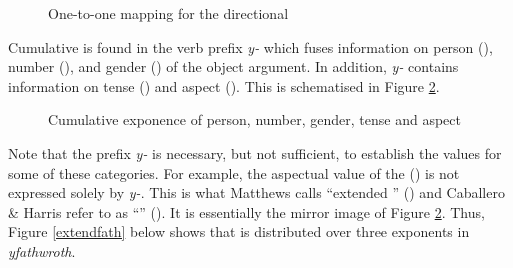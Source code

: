 \begin{figure}
\begin{center}
\end{center}
\caption{One-to-one mapping for the directional}
\label{one-to-one}
\end{figure}%

Cumulative  is found in the verb prefix \emph{y-} which fuses information on person (\Third), number (\Sg), and gender (\Masc) of the object argument. In addition, \emph{y-} contains information on tense (\Nonpast) and aspect (\Ipfv{}). This is schematised in Figure \ref{cumulfath}.

\begin{figure}
\begin{center}
\end{center}
\caption{Cumulative exponence of person, number, gender, tense and aspect}
\label{cumulfath}
\end{figure}%

Note that the prefix \emph{y-} is necessary, but not sufficient, to establish the values for some of these categories. For example, the aspectual value of the  (\Ipfv) is not expressed solely by \emph{y-}. This is what Matthews calls ``extended '' (\citeyear[147-149]{Matthews:1979vm}) and Caballero \& Harris refer to as ``'' (\citeyear[163]{Caballero:2012vr}). It is essentially the mirror image of Figure \ref{cumulfath}. Thus, Figure \ref{extendfath} below shows that  is distributed over three exponents in \emph{yfathwroth}.

